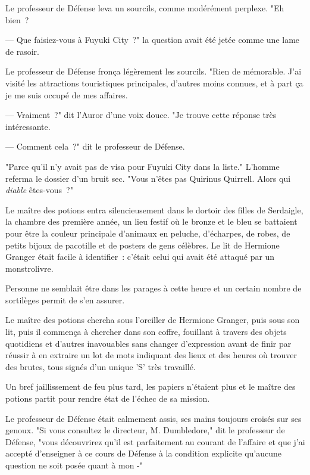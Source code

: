 Le professeur de Défense leva un sourcils, comme modérément perplexe. "Eh bien~?

--- Que faisiez-vous à Fuyuki City~?" la question avait été jetée comme une lame de rasoir.

Le professeur de Défense fronça légèrement les sourcils. "Rien de mémorable. J'ai visité les attractions touristiques principales, d'autres moins connues, et à part ça je me suis occupé de mes affaires.

--- Vraiment~?" dit l'Auror d'une voix douce. "Je trouve cette réponse très intéressante.

--- Comment cela~?" dit le professeur de Défense.

"Parce qu'il n'y avait pas de visa pour Fuyuki City dans la liste." L'homme referma le dossier d'un bruit sec. "Vous n'êtes pas Quirinus Quirrell. Alors qui \emph{diable} êtes-vous~?"

\later

Le maître des potions entra silencieusement dans le dortoir des filles de Serdaigle, la chambre des première année, un lieu festif où le bronze et le bleu se battaient pour être la couleur principale d'animaux en peluche, d'écharpes, de robes, de petits bijoux de pacotille et de posters de gens célèbres. Le lit de Hermione Granger était facile à identifier~: c'était celui qui avait été attaqué par un monstrolivre.

Personne ne semblait être dans les parages à cette heure et un certain nombre de sortilèges permit de s'en assurer.

Le maître des potions chercha sous l'oreiller de Hermione Granger, puis sous son lit, puis il commença à chercher dans son coffre, fouillant à travers des objets quotidiens et d'autres inavouables sans changer d'expression avant de finir par réussir à en extraire un lot de mots indiquant des lieux et des heures où trouver des brutes, tous signés d'un unique 'S' très travaillé.

Un bref jaillissement de feu plus tard, les papiers n'étaient plus et le maître des potions partit pour rendre état de l'échec de sa mission.

\later

Le professeur de Défense était calmement assis, ses mains toujours croisés sur ses genoux. "Si vous consultez le directeur, M. Dumbledore," dit le professeur de Défense, "vous découvrirez qu'il est parfaitement au courant de l'affaire et que j'ai accepté d'enseigner à ce cours de Défense à la condition explicite qu'aucune question ne soit posée quant à mon -"


